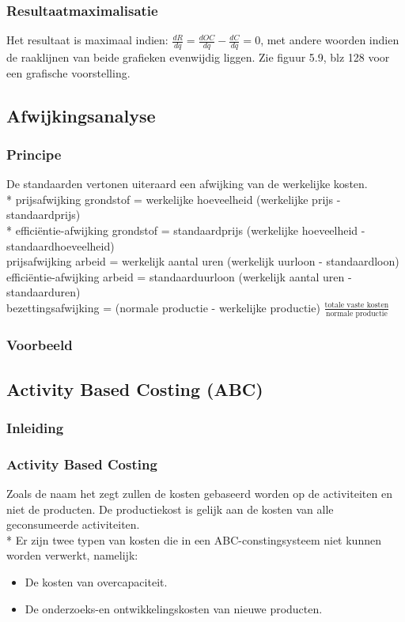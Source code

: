 \documentclass[12pt]{article}
\begin{document}
\subsubsection{Resultaatmaximalisatie}
Het resultaat is maximaal indien: $\frac{dR}{dq} = \frac{dOC}{dq} - \frac{dC}{dq} = 0$, met andere woorden indien de raaklijnen van beide grafieken evenwijdig liggen. Zie figuur 5.9, blz 128 voor een grafische voorstelling.
\subsection{Afwijkingsanalyse}
\subsubsection{Principe}
De standaarden vertonen uiteraard een afwijking van de werkelijke kosten.\\*
prijsafwijking grondstof = werkelijke hoeveelheid (werkelijke prijs - standaardprijs)\\*
effici\"entie-afwijking grondstof = standaardprijs (werkelijke hoeveelheid - standaardhoeveelheid)\\
prijsafwijking arbeid = werkelijk aantal uren (werkelijk uurloon - standaardloon)\\
effici\"entie-afwijking arbeid = standaarduurloon (werkelijk aantal uren - standaarduren)\\
bezettingsafwijking = (normale productie - werkelijke productie) $\frac{\text{totale vaste kosten}}{\text{normale productie}}$
\subsubsection{Voorbeeld}
\subsection{Activity Based Costing (ABC)}
\subsubsection{Inleiding}
\subsubsection{Activity Based Costing}
Zoals de naam het zegt zullen de kosten gebaseerd worden op de activiteiten en niet de producten. De productiekost is gelijk aan de kosten van alle geconsumeerde activiteiten.\\*
Er zijn twee typen van kosten die in een ABC-constingsysteem niet kunnen worden verwerkt, namelijk:
\begin{itemize}
\item De kosten van overcapaciteit.
\item De onderzoeks-en ontwikkelingskosten van nieuwe producten.
\end{itemize}
\end{document}
